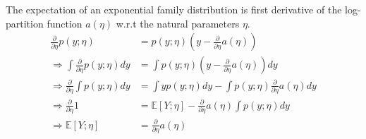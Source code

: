 \begin{answer}
The expectation of an exponential family distribution is first derivative of
the log-partition function $a(\eta)$ w.r.t the natural parameters $\eta$.
    \begin{align*}
      \frac{\partial}{\partial{\eta}}p(y;\eta)
      &= p(y;\eta)\left(y - \frac{\partial}{\partial{\eta}}a(\eta)\right) \\
      \Rightarrow \int \frac{\partial}{\partial{\eta}}p(y;\eta)dy
      &= \int p(y;\eta)\left(y -
        \frac{\partial}{\partial{\eta}}a(\eta)\right)dy \\
      \Rightarrow  \frac{\partial}{\partial{\eta}}\int p(y;\eta)dy
        &= \int yp(y;\eta)dy
          - \int p(y;\eta)\frac{\partial}{\partial{\eta}}a(\eta)dy \\
      \Rightarrow  \frac{\partial}{\partial{\eta}}1
        &= \mathbb{E}[Y;\eta] -
          \frac{\partial}{\partial{\eta}}a(\eta)\int p(y;\eta)dy \\
      \Rightarrow \mathbb{E}[Y; \eta]
        &= \frac{\partial}{\partial{\eta}}a(\eta)
    \end{align*}
\end{answer}
